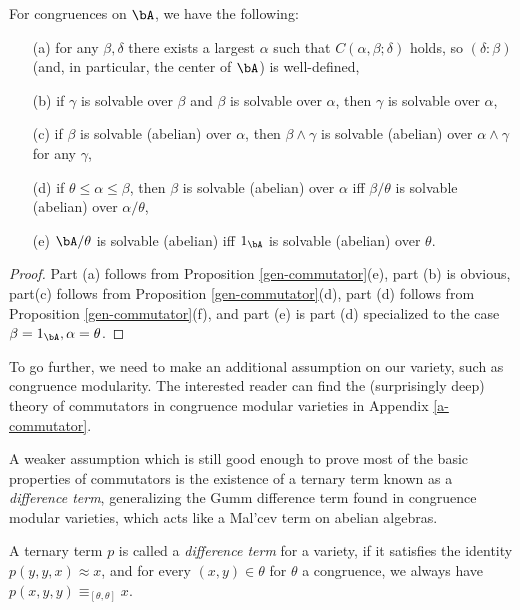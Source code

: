 \begin{prop} For congruences on $\bA$, we have the following:
\begin{itemize}
\item[(a)] for any $\beta,\delta$ there exists a largest $\alpha$ such that $C(\alpha,\beta;\delta)$ holds, so $(\delta:\beta)$ (and, in particular, the center of $\bA$) is well-defined,

\item[(b)] if $\gamma$ is solvable over $\beta$ and $\beta$ is solvable over $\alpha$, then $\gamma$ is solvable over $\alpha$,

\item[(c)] if $\beta$ is solvable (abelian) over $\alpha$, then $\beta \wedge \gamma$ is solvable (abelian) over $\alpha \wedge \gamma$ for any $\gamma$,

\item[(d)] if $\theta \le \alpha \le \beta$, then $\beta$ is solvable (abelian) over $\alpha$ iff $\beta/\theta$ is solvable (abelian) over $\alpha/\theta$,

\item[(e)] $\bA/\theta$ is solvable (abelian) iff $1_\bA$ is solvable (abelian) over $\theta$.
\end{itemize}
\end{prop}
\begin{proof} Part (a) follows from Proposition \ref{gen-commutator}(e), part (b) is obvious, part(c) follows from Proposition \ref{gen-commutator}(d), part (d) follows from Proposition \ref{gen-commutator}(f), and part (e) is part (d) specialized to the case $\beta = 1_\bA, \alpha = \theta$.
\end{proof}

To go further, we need to make an additional assumption on our variety, such as congruence modularity. The interested reader can find the (surprisingly deep) theory of commutators in congruence modular varieties in Appendix \ref{a-commutator}.

A weaker assumption which is still good enough to prove most of the basic properties of commutators is the existence of a ternary term known as a \emph{difference term}, generalizing the Gumm difference term found in congruence modular varieties, which acts like a Mal'cev term on abelian algebras.

\begin{defn} A ternary term $p$ is called a \emph{difference term} for a variety, if it satisfies the identity $p(y,y,x) \approx x$, and for every $(x,y) \in \theta$ for $\theta$ a congruence, we always have $p(x,y,y) \equiv_{[\theta,\theta]} x$.
\end{defn}

